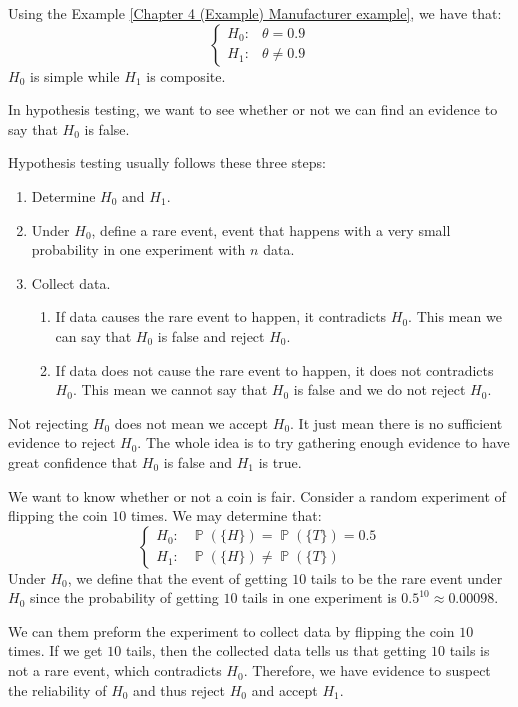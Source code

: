 \documentclass{huhtakm-template-book-v2}
\DeclareMathOperator{\prob}{\mathbb{P}}
\begin{document}
\newpage
\begin{eg}
	Using the Example \ref{Chapter 4 (Example) Manufacturer example}, we have that:
	\begin{equation*}
		\begin{cases}
			H_{0}: &\theta=0.9\\
			H_{1}: &\theta\neq 0.9
		\end{cases}
	\end{equation*}
	$H_{0}$ is simple while $H_{1}$ is composite.
\end{eg}
In hypothesis testing, we want to see whether or not we can find an evidence to say that $H_{0}$ is false.
\begin{rem}
	Hypothesis testing usually follows these three steps:
	\begin{enumerate}
		\item Determine $H_{0}$ and $H_{1}$.
		\item Under $H_{0}$, define a rare event, event that happens with a very small probability in one experiment with $n$ data.
		\item Collect data.
		\begin{enumerate}
			\item If data causes the rare event to happen, it contradicts $H_{0}$. This mean we can say that $H_{0}$ is false and reject $H_{0}$.
			\item If data does not cause the rare event to happen, it does not contradicts $H_{0}$. This mean we cannot say that $H_{0}$ is false and we do not reject $H_{0}$.
		\end{enumerate}
	\end{enumerate}
\end{rem}
\begin{rem}
	Not rejecting $H_{0}$ does not mean we accept $H_{0}$. It just mean there is no sufficient evidence to reject $H_{0}$. The whole idea is to try gathering enough evidence to have great confidence that $H_{0}$ is false and $H_{1}$ is true.
\end{rem}
\begin{eg}
	We want to know whether or not a coin is fair. Consider a random experiment of flipping the coin $10$ times. We may determine that:
	\begin{equation*}
		\begin{cases}
			H_{0}: &\prob(\{H\})=\prob(\{T\})=0.5\\
			H_{1}: &\prob(\{H\})\neq\prob(\{T\})
		\end{cases}
	\end{equation*}
	Under $H_{0}$, we define that the event of getting $10$ tails to be the rare event under $H_{0}$ since the probability of getting $10$ tails in one experiment is $0.5^{10}\approx 0.00098$.
	
	We can them preform the experiment to collect data by flipping the coin $10$ times. If we get $10$ tails, then the collected data tells us that getting $10$ tails is not a rare event, which contradicts $H_{0}$. Therefore, we have evidence to suspect the reliability of $H_{0}$ and thus reject $H_{0}$ and accept $H_{1}$.
\end{eg}
\end{document}
